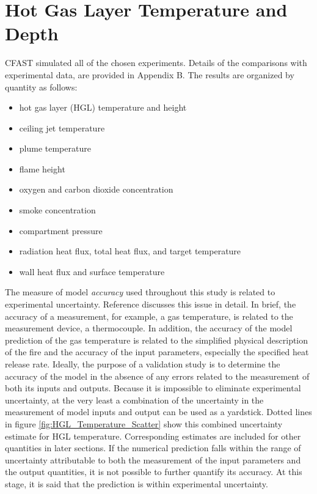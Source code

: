 \chapter{Hot Gas Layer Temperature and Depth}

CFAST simulated all of the chosen experiments.  Details of the comparisons with experimental data, are provided in Appendix B.  The results are organized by quantity as follows:

\begin{itemize}
\item hot gas layer (HGL) temperature and height
\item ceiling jet temperature
\item plume temperature 
\item flame height
\item oxygen and carbon dioxide concentration
\item smoke concentration
\item compartment pressure
\item radiation heat flux, total heat flux, and target temperature
\item wall heat flux and surface temperature
\end{itemize}

The measure of model \emph{accuracy} used throughout this study is related to experimental uncertainty. Reference \cite{NRCNUREG1824}  discusses this issue in detail. In brief, the accuracy of a measurement, for example, a gas temperature, is related to the measurement device, a thermocouple. In addition, the accuracy of the model prediction of the gas temperature is related to the simplified physical description of the fire and the accuracy of the input parameters, especially the specified heat release rate. Ideally, the purpose of a validation study is to determine the accuracy of the model in the absence of any errors related to the measurement of both its inputs and outputs. Because it is impossible to eliminate experimental uncertainty, at the very least a combination of the uncertainty in the measurement of model inputs and output can be used as a yardstick. Dotted lines in figure \ref{fig:HGL_Temperature_Scatter}  show this combined uncertainty estimate for HGL temperature. Corresponding estimates are included for other quantities in later sections. If the numerical prediction falls within the range of uncertainty attributable to both the measurement of the input parameters and the output quantities, it is not possible to further quantify its accuracy. At this stage, it is said that the prediction is within experimental uncertainty.

